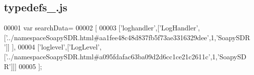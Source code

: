 \subsection{typedefs\+\_.\+js}
\label{typedefs__4_8js_source}

\begin{DoxyCode}
00001 var searchData=
00002 [
00003   [\textcolor{stringliteral}{'loghandler'},[\textcolor{stringliteral}{'LogHandler'},[\textcolor{stringliteral}{'../namespaceSoapySDR.html#aa1fee48c48d837fb5f73ae3316329dee'},1,\textcolor{stringliteral}{'SoapySDR'}]]
      ],
00004   [\textcolor{stringliteral}{'loglevel'},[\textcolor{stringliteral}{'LogLevel'},[\textcolor{stringliteral}{'../namespaceSoapySDR.html#a095fdafac63ba09d2d6cc1ce21c2611c'},1,\textcolor{stringliteral}{'SoapySDR'}]]]
00005 ];
\end{DoxyCode}
